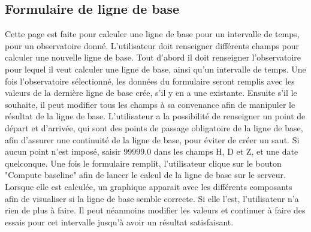 \documentclass[10pt,a4paper]{report}
\begin{document}
\subsection{Formulaire de ligne de base}
\label{sec:baseline}
Cette page est faite pour calculer une ligne de base pour un intervalle de temps, pour un observatoire donné.
\linebreak
L'utilisateur doit renseigner différents champs pour calculer une nouvelle ligne de base.
Tout d'abord il doit renseigner l'observatoire pour lequel il veut calculer une ligne de base, ainsi qu'un intervalle de temps. Une fois l'observatoire sélectionné, les données du formulaire seront remplis avec les valeurs de la dernière ligne de base crée, s'il y en a une existante. Ensuite s'il le souhaite, il peut modifier tous les champs à sa convenance afin de manipuler le résultat de la ligne de base. L'utilisateur a la possibilité de renseigner un point de départ et d'arrivée, qui sont des points de passage obligatoire de la ligne de base, afin d'assurer une continuité de la ligne de base, pour éviter de créer un saut. Si aucun point n'est imposé, saisir 99999.0 dans les champs H, D et Z, et une date quelconque.
\linebreak
Une fois le formulaire remplit, l'utilisateur clique sur le bouton "Compute baseline" afin de lancer le calcul de la ligne de base sur le serveur. Lorsque elle est calculée, un graphique apparait avec les différents composants afin de visualiser si la ligne de base semble correcte. Si elle l'est, l'utilisateur n'a rien de plus à faire. Il peut néanmoins modifier les valeurs et continuer à faire des essais pour cet intervalle jusqu'à avoir un résultat satisfaisant.
\end{document}
